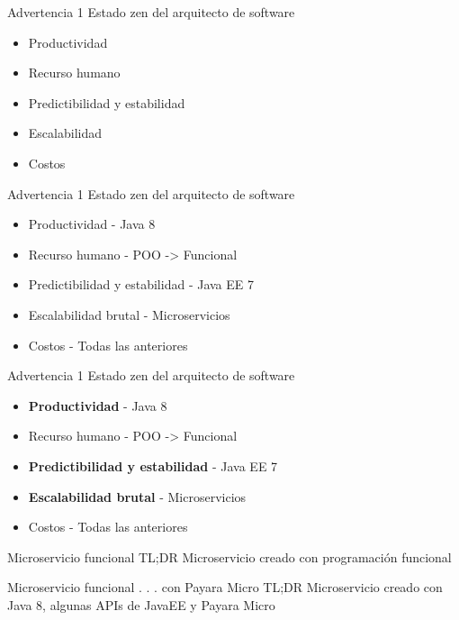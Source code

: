 \documentclass{beamer}
\begin{document}
\begin{frame}{Advertencia 1}
Estado zen del arquitecto de software
\begin{itemize}
	\item Productividad
	\item Recurso humano
	\item Predictibilidad y estabilidad
	\item Escalabilidad
	\item Costos
\end{itemize}
\end{frame}

\begin{frame}{Advertencia 1}
Estado zen del arquitecto de software
\begin{itemize}
	\item Productividad - Java 8
	\item Recurso humano - POO -> Funcional
	\item Predictibilidad y estabilidad - Java EE 7
	\item Escalabilidad brutal - Microservicios
	\item Costos - Todas las anteriores
\end{itemize}
\end{frame}

\begin{frame}{Advertencia 1}
Estado zen del arquitecto de software
\begin{itemize}
	\item \textbf{Productividad} - Java 8
	\item Recurso humano - POO -> Funcional
	\item \textbf{Predictibilidad y estabilidad} - Java EE 7
	\item \textbf{Escalabilidad brutal} - Microservicios
	\item Costos - Todas las anteriores
\end{itemize}
\end{frame}

\begin{frame}{Microservicio funcional}
\huge TL;DR Microservicio creado con programación funcional
\end{frame}

\begin{frame}{Microservicio funcional . . . con Payara Micro}
\huge TL;DR Microservicio creado con Java 8, algunas APIs de JavaEE y Payara Micro
\end{frame}
\end{document}
